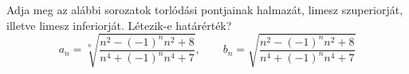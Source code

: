 \documentclass[11pt]{scrartcl}
\begin{document}
Adja meg az alábbi sorozatok torlódási pontjainak halmazát, limesz
szuperiorját, illetve limesz inferiorját. Létezik-e határérték?
\[
	a_n = \sqrt[n]{\frac{n^2 - (-1)^n n^2 + 8}{n^4 + (-1)^n n^4 + 7}}, \qquad
	b_n = \sqrt{\frac{n^2 - (-1)^n n^2 + 8}{n^4 + (-1)^n n^4 + 7}}
\]
\end{document}
